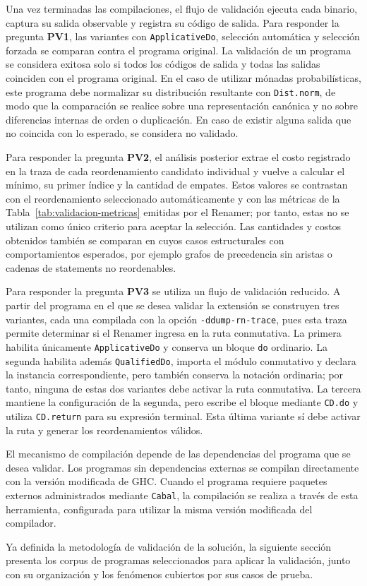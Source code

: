 Una vez terminadas las compilaciones, el flujo de validación ejecuta cada binario, captura su salida observable y registra su código de salida. Para responder la pregunta \textbf{PV1}, las variantes con \texttt{ApplicativeDo}, selección automática y selección forzada se comparan contra el programa original. La validación de un programa se considera exitosa solo si todos los códigos de salida y todas las salidas coinciden con el programa original. En el caso de utilizar mónadas probabilísticas, este programa debe normalizar su distribución resultante con \texttt{Dist.norm}, de modo que la comparación se realice sobre una representación canónica y no sobre diferencias internas de orden o duplicación. En caso de existir alguna salida que no coincida con lo esperado, se considera no validado.

Para responder la pregunta \textbf{PV2}, el análisis posterior extrae el costo registrado en la traza de cada reordenamiento candidato individual y vuelve a calcular el mínimo, su primer índice y la cantidad de empates. Estos valores se contrastan con el reordenamiento seleccionado automáticamente y con las métricas de la Tabla~\ref{tab:validacion-metricas} emitidas por el Renamer; por tanto, estas no se utilizan como único criterio para aceptar la selección. Las cantidades y costos obtenidos también se comparan en cuyos casos estructurales con comportamientos esperados, por ejemplo grafos de precedencia sin aristas o cadenas de statements no reordenables.

Para responder la pregunta \textbf{PV3} se utiliza un flujo de validación reducido. A partir del programa en el que se desea validar la extensión se construyen tres variantes, cada una compilada con la opción \texttt{-ddump-rn-trace}, pues esta traza permite determinar si el Renamer ingresa en la ruta conmutativa. La primera habilita únicamente \texttt{ApplicativeDo} y conserva un bloque \texttt{do} ordinario. La segunda habilita además \texttt{QualifiedDo}, importa el módulo conmutativo y declara la instancia correspondiente, pero también conserva la notación ordinaria; por tanto, ninguna de estas dos variantes debe activar la ruta conmutativa. La tercera mantiene la configuración de la segunda, pero escribe el bloque mediante \texttt{CD.do} y utiliza \texttt{CD.return} para su expresión terminal. Esta última variante sí debe activar la ruta y generar los reordenamientos válidos. 

El mecanismo de compilación depende de las dependencias del programa que se desea validar. Los programas sin dependencias externas se compilan directamente con la versión modificada de \textsf{GHC}. Cuando el programa requiere paquetes externos administrados mediante \texttt{Cabal}, la compilación se realiza a través de esta herramienta, configurada para utilizar la misma versión modificada del compilador.

Ya definida la metodología de validación de la solución, la siguiente sección presenta los corpus de programas seleccionados para aplicar la validación, junto con su organización y los fenómenos cubiertos por sus casos de prueba.
